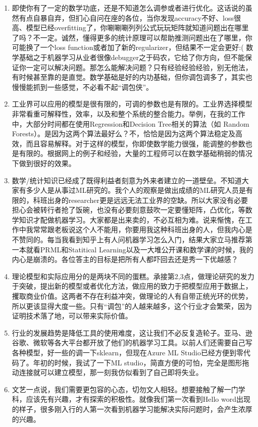 \documentclass[]{ctexbook}
\begin{document}
\begin{enumerate}
\def\labelenumi{\arabic{enumi}.}
\item
  即使你有了一定的数学功底，还是不知道怎么调参或者进行优化。这话说的虽然有点自暴自弃，但扪心自问在座的各位，当你发现accuracy不好、loss很高、模型已经overfitting了，你唰唰唰列列公式玩玩矩阵就知道问题出在哪里了吗？不一定。诚然，懂得更多的统计原理可以帮助推测问题出在了哪里，你可能换了一个loss function或者加了新的regularizer，但结果不一定会更好:( 数学基础之于机器学习从业者很像debugger之于码农，它给了你方向，但不能保证你一定可以解决问题。那怎么能解决问题？只有经验经验经验，别无他法，有时候甚至靠的是直觉。数学基础是好的内功基础，但你调包调多了，其实也慢慢能抓到一些感觉，不必看不起``调包侠''。
\item
  工业界可以应用的模型是很有限的，可调的参数也是有限的。工业界选择模型非常看重可解释性，效率，以及和整个系统的整合能力。举例，在我的工作中，大部分时间都在使用Regression和Decision Tree相关的算法（如 Random Forests）。是因为这两个算法最好么？不，恰恰是因为这两个算法稳定及高效，而且容易解释。对于这样的模型，你即使数学能力很强，能调整的参数也是有限的。根据网上的例子和经验，大量的工程师可以在数学基础稍弱的情况下做到很好的效果。
\item
  数学/统计知识已经成了既得利益者刻意为外来者建立的一道壁垒。不知道大家有多少人是从事过ML研究的。我个人的观察是做出成绩的ML研究人员是有限的，科班出身的researcher更是远远无法工业界的空缺。所以大家没有必要担心会被转行者抢了饭碗，也没有必要刻意鼓吹一定要懂矩阵，凸优化，等数学知识才配做机器学习。大家都是出来卖的，不必互相为难。说来惭愧，在工作中我常常跟老板说这个人不能用，你要用我这种科班出身的人，但我内心是不赞同的。每当我看到知乎上有人问机器学习怎么入门，结果大家立马推荐第一本就看PRML和Statitical Learning以及一大堆公开课和数学课的时候，我的内心是崩溃的。各位答主的目标是把所有人都吓回去还是秀一下优越感？
\item
  理论模型和实际应用分的是两块不同的蛋糕。承接第2,3点，做理论研究的发力于突破，提出新的模型或者优化方法，做应用的致力于把模型应用于数据上，攫取商业价值。这两者不存在利益冲突，做理论的人有自带正统光环的优势，所以更该显得大度一些。只有``调包''的人越来越多，这个行业才会繁荣，因为证明技术落了地，可以带来实际价值。
\item
  行业的发展趋势是降低工具的使用难度，这让我们不必反复造轮子。亚马、逊谷歌、微软等各大平台都开放了他们的机器学习工具。以前人们还需要自己写各种模型，好一些的调一下sklearn，但现在Azure ML Studio已经方便到零代码了。年初的时候，我试了一下ML studio，简直方便的可怕，完全是图形拖动连接就可以建立模型，那一刻我仿似看到了自己即将失业。
\item
  文艺一点说，我们需要更包容的心态，切勿文人相轻。想要接触了解一门学科，应该先有兴趣，才有探索的积极性。就像我们第一次看到Hello word出现的样子，很多刚入行的人第一次看到机器学习能解决实际问题时，会产生浓厚的兴趣。
\end{enumerate}
\end{document}
